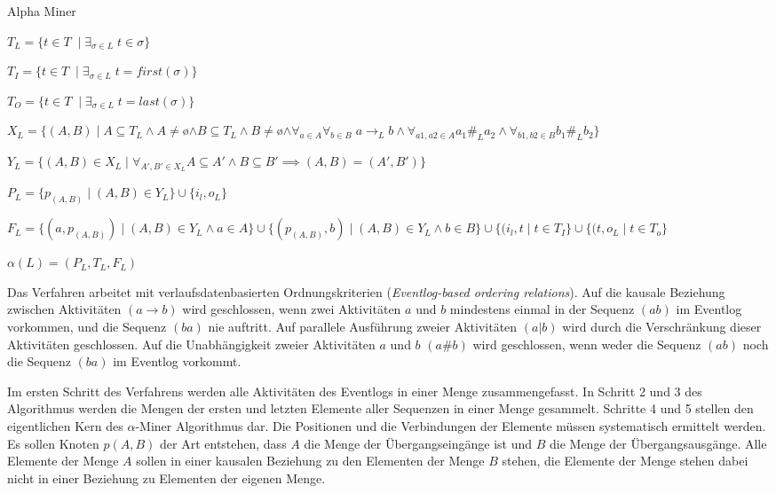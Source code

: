 \providecommand\algorithmname{alphaminer}
\begin{algorithm}
  \caption{Alpha Miner}
  \label{alg:alphaminer}
  \begin{algorithmic}[1]
    \State $T_L = \{ t \in T \;\mid \exists_{\sigma \in L} \; t \in \sigma\}$ \label{op0}
    
    \State $T_I = \{ t \in T \;\mid \exists_{\sigma \in L} \; t=first(\sigma)\}$ \label{op1}
    
    \State $T_O = \{ t \in T \;\mid \exists_{\sigma \in L} \; t=last(\sigma)\}$ \label{op2}
    
    \State $X_L = \{ (A,B) \mid A \subseteq T_L \land A \neq $\o$ \land B \subseteq T_L \land B \neq $\o$ \land \forall_{a\in A} \forall_{b\in B}\; a \to _L b \land \forall_{a1,a2\in A} a_1 \# _L a_2 \land \forall_{b1,b2\in B} b_1 \# _L b_2\}$ \label{op3}
    
    \State $Y_L = \{ (A,B) \in X_L \mid \forall_{A',B' \in X_L} A \subseteq A' \land B \subseteq B' \implies (A,B) = (A',B')\}$ \label{op4}
    
    \State $P_L = \{ p_{(A,B)} \mid (A,B) \in Y_L \} \cup \{i_l, o_L \}$ \label{op5}
    
    \State $F_L = \{ (a,p_{(A,B)}) \mid (A,B) \in Y_L \land a \in A \} \cup \{  (p_ {(A,B)},b) \mid (A,B) \in Y_L \land b \in B \} \cup \{ (i_l,t \mid t \in T_I  \} \cup \{ (t,o_L \mid t\in T_o\}$ \label{op6}
    
    \State $\alpha(L) = (P_L, T_L, F_L) $ \label{op7}
    
  \end{algorithmic}
\end{algorithm}

Das Verfahren arbeitet mit verlaufsdatenbasierten Ordnungskriterien (\textit{Eventlog-based ordering relations}). Auf die kausale Beziehung zwischen Aktivitäten $(a→b)$ wird geschlossen, wenn zwei Aktivitäten $a$ und $b$ mindestens einmal in der Sequenz $(ab)$ im Eventlog vorkommen, und die Sequenz $(ba)$ nie auftritt. Auf parallele Ausführung zweier Aktivitäten $(a|b)$ wird durch die Verschränkung dieser Aktivitäten geschlossen. Auf die Unabhängigkeit zweier Aktivitäten $a$ und $b$ $(a\#b)$ wird geschlossen, wenn weder die Sequenz $(ab)$ noch die Sequenz $(ba)$ im Eventlog vorkommt.

Im ersten Schritt des Verfahrens werden alle Aktivitäten des Eventlogs in einer Menge zusammengefasst. In Schritt 2 und 3 des Algorithmus werden die Mengen der ersten und letzten Elemente aller Sequenzen in einer Menge gesammelt. 
Schritte 4 und 5 stellen den eigentlichen Kern des $\alpha$-Miner Algorithmus dar. Die Positionen und die Verbindungen der Elemente müssen systematisch ermittelt werden. Es sollen Knoten $p(A,B)$ der Art entstehen, dass $A$ die Menge der Übergangseingänge ist und $B$ die Menge der Übergangsausgänge. Alle Elemente der Menge $A$ sollen in einer kausalen Beziehung zu den Elementen der Menge $B$ stehen, die Elemente der Menge stehen dabei nicht in einer Beziehung zu Elementen der eigenen Menge.

